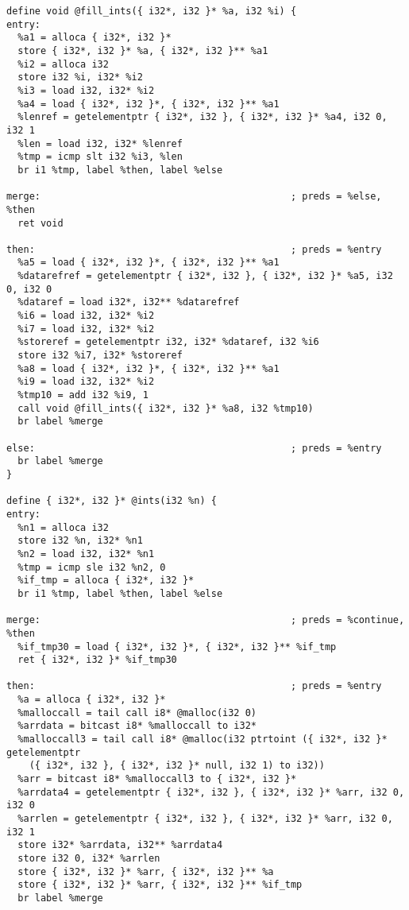 \documentclass[main.tex]{subfiles}
\begin{document}
{\begin{lstlisting}
define void @fill_ints({ i32*, i32 }* %a, i32 %i) {
entry:
  %a1 = alloca { i32*, i32 }*
  store { i32*, i32 }* %a, { i32*, i32 }** %a1
  %i2 = alloca i32
  store i32 %i, i32* %i2
  %i3 = load i32, i32* %i2
  %a4 = load { i32*, i32 }*, { i32*, i32 }** %a1
  %lenref = getelementptr { i32*, i32 }, { i32*, i32 }* %a4, i32 0, i32 1
  %len = load i32, i32* %lenref
  %tmp = icmp slt i32 %i3, %len
  br i1 %tmp, label %then, label %else

merge:                                            ; preds = %else, %then
  ret void

then:                                             ; preds = %entry
  %a5 = load { i32*, i32 }*, { i32*, i32 }** %a1
  %datarefref = getelementptr { i32*, i32 }, { i32*, i32 }* %a5, i32 0, i32 0
  %dataref = load i32*, i32** %datarefref
  %i6 = load i32, i32* %i2
  %i7 = load i32, i32* %i2
  %storeref = getelementptr i32, i32* %dataref, i32 %i6
  store i32 %i7, i32* %storeref
  %a8 = load { i32*, i32 }*, { i32*, i32 }** %a1
  %i9 = load i32, i32* %i2
  %tmp10 = add i32 %i9, 1
  call void @fill_ints({ i32*, i32 }* %a8, i32 %tmp10)
  br label %merge

else:                                             ; preds = %entry
  br label %merge
}

define { i32*, i32 }* @ints(i32 %n) {
entry:
  %n1 = alloca i32
  store i32 %n, i32* %n1
  %n2 = load i32, i32* %n1
  %tmp = icmp sle i32 %n2, 0
  %if_tmp = alloca { i32*, i32 }*
  br i1 %tmp, label %then, label %else

merge:                                            ; preds = %continue, %then
  %if_tmp30 = load { i32*, i32 }*, { i32*, i32 }** %if_tmp
  ret { i32*, i32 }* %if_tmp30

then:                                             ; preds = %entry
  %a = alloca { i32*, i32 }*
  %malloccall = tail call i8* @malloc(i32 0)
  %arrdata = bitcast i8* %malloccall to i32*
  %malloccall3 = tail call i8* @malloc(i32 ptrtoint ({ i32*, i32 }* getelementptr 
    ({ i32*, i32 }, { i32*, i32 }* null, i32 1) to i32))
  %arr = bitcast i8* %malloccall3 to { i32*, i32 }*
  %arrdata4 = getelementptr { i32*, i32 }, { i32*, i32 }* %arr, i32 0, i32 0
  %arrlen = getelementptr { i32*, i32 }, { i32*, i32 }* %arr, i32 0, i32 1
  store i32* %arrdata, i32** %arrdata4
  store i32 0, i32* %arrlen
  store { i32*, i32 }* %arr, { i32*, i32 }** %a
  store { i32*, i32 }* %arr, { i32*, i32 }** %if_tmp
  br label %merge


\end{lstlisting}}
\end{document}
